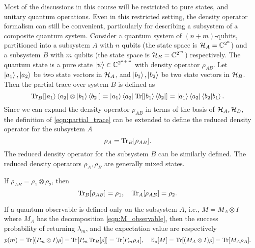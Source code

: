 Most of the discussions in this course will be restricted to pure states, and unitary quantum operations. 
Even in this restricted setting, the density operator formalism can still be convenient, particularly for describing a subsystem of a composite quantum system. 
Consider a quantum system of $(n+m)$-qubits,
partitioned into a subsystem $A$ with $n$ qubits (the state space is $\mathcal{H}_A=\mathbb{C}^{2^n}$) and a subsystem $B$ with $m$ qubits (the state space is $\mathcal{H}_B=\mathbb{C}^{2^m}$) respectively. 
The quantum state is a pure state $\ket{\psi}\in \mathbb{C}^{2^{n+m}}$ with density operator $\rho_{AB}$. 
Let $\ket{a_1},\ket{a_2}$ be two state vectors in $\mathcal{H}_A$, and $\ket{b_1},\ket{b_2}$ be two state vectors in $\mathcal{H}_B$. 
Then the partial trace over system $B$ is defined as
\begin{equation}
  \operatorname{Tr}_{B}[\ket{a_1}\bra{a_2}\otimes \ket{b_1}\bra{b_2}] = \ket{a_1}\bra{a_2} \operatorname{Tr}[\ket{b_1}\bra{b_2}] = \ket{a_1}\bra{a_2} \braket{b_2|b_1}.
  \label{eqn:partial_trace}
\end{equation}
Since we can expand the density operator $\rho_{AB}$ in terms of the basis of $\mathcal{H}_A,\mathcal{H}_B$, the definition of \eqref{eqn:partial_trace} can be extended to define
the reduced density operator for the subsystem $A$
\begin{equation}
  \rho_{A} = \operatorname{Tr}_{B}[\rho_{AB}].
  \label{eqn:reduced_density_operator}
\end{equation}
The reduced density operator for the subsystem $B$ can be similarly defined.  The reduced density operators $\rho_A,\rho_B$ are generally mixed states. 

\begin{exam}
If $\rho_{AB}=\rho_1\otimes \rho_2$, then 
\begin{equation}
\operatorname{Tr}_{B}[\rho_{AB}] = \rho_1, \quad  \operatorname{Tr}_{A}[\rho_{AB}] = \rho_2.
\end{equation}
\end{exam}

If a quantum observable is defined only on the subsystem $A$, i.e., $M=M_A\otimes I$ where $M_A$ has the decomposition \eqref{eqn:M_observable}, 
then the success probability of returning $\lambda_m$, and the expectation value are respectively
\begin{equation}
  p(m)=\operatorname{Tr}[(P_m\otimes I) \rho] = \operatorname{Tr}[P_m \operatorname{Tr}_B[\rho]] = \operatorname{Tr}[P_m \rho_A], \quad  \mathbb{E}_{\rho}[M]=\operatorname{Tr}[(M_A\otimes I) \rho] = \operatorname{Tr}[M_A \rho_A].
  \label{eqn:measure_reduced_density}
\end{equation}


